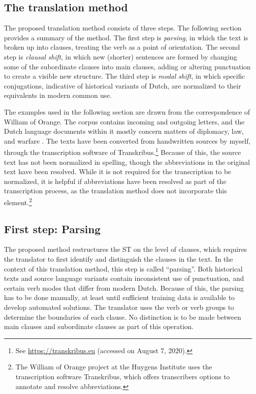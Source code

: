 \begin{paper}
\section{The translation method}

The proposed translation method consists of three steps. The following
section provides a summary of the method. The first step is
\emph{parsing}, in which the text is broken up into clauses, treating
the verb as a point of orientation. The second step is \emph{clausal
shift}, in which new (shorter) sentences are formed by changing some of
the subordinate clauses into main clauses, adding or altering
punctuation to create a visible new structure. The third step is
\emph{modal shift}, in which specific conjugations, indicative of
historical variants of Dutch, are normalized to their equivalents in
modern common use.

The examples used in the following section are drawn from the
correspondence of William of Orange. The corpus contains incoming and
outgoing letters, and the Dutch language documents within it mostly
concern matters of diplomacy, law, and warfare \citep[117]{hoekstra_correspondentie_2007}. The
texts have been converted from handwritten sources by myself, through
the transcription software of Transkribus.\footnote{See \url{https://transkribus.eu} (accessed on August 7, 2020).} Because of this, the source
text has not been normalized in spelling, though the abbreviations in
the original text have been resolved. While it is not required for the
transcription to be normalized, it is helpful if abbreviations have been
resolved as part of the transcription process, as the translation method
does not incorporate this element.\footnote{The William of Orange
  project at the Huygens Institute uses the transcription software
  Transkribus, which offers transcribers options to annotate and resolve
  abbreviations.}

\subsection{First step: Parsing}

The proposed method restructures the ST on the level of clauses, which
requires the translator to first identify and distinguish the clauses in
the text. In the context of this translation method, this step is called
``parsing''. Both historical texts and source language variants contain
inconsistent use of punctuation, and certain verb modes that differ from
modern Dutch. Because of this, the parsing has to be done manually, at
least until sufficient training data is available to develop automated
solutions. The translator uses the verb or verb groups to determine the
boundaries of each clause. No distinction is to be made between main
clauses and subordinate clauses as part of this operation.


\end{paper}
